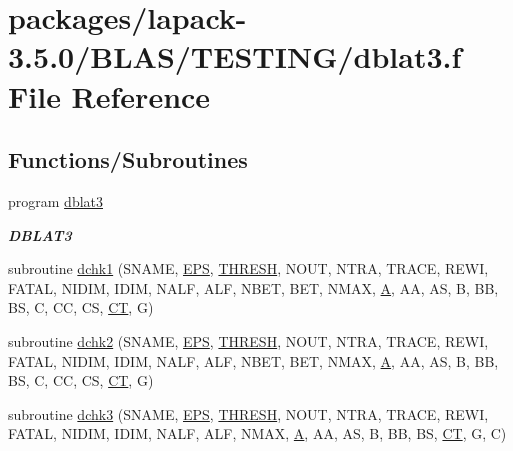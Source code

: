 \hypertarget{dblat3_8f}{}\section{packages/lapack-\/3.5.0/\+B\+L\+A\+S/\+T\+E\+S\+T\+I\+N\+G/dblat3.f File Reference}
\label{dblat3_8f}
\subsection*{Functions/\+Subroutines}
\begin{DoxyCompactItemize}
\item 
program \hyperlink{group__double__blas__testing_ga797f4debf4a6bff750260b5347fb61ed}{dblat3}
\begin{DoxyCompactList}\small\item\em {\bfseries D\+B\+L\+A\+T3} \end{DoxyCompactList}\item 
subroutine \hyperlink{dblat3_8f_aed7f81c98a71065151dd694b6abeceba}{dchk1} (S\+N\+A\+M\+E, \hyperlink{tukey_8c_a6ebf6899d6c1c8b7b9d09be872c05aae}{E\+P\+S}, \hyperlink{zlaqgs_8c_a0656018abfc9fa2821827415f5d5ea57}{T\+H\+R\+E\+S\+H}, N\+O\+U\+T, N\+T\+R\+A, T\+R\+A\+C\+E, R\+E\+W\+I, F\+A\+T\+A\+L, N\+I\+D\+I\+M, I\+D\+I\+M, N\+A\+L\+F, A\+L\+F, N\+B\+E\+T, B\+E\+T, N\+M\+A\+X, \hyperlink{classA}{A}, A\+A, A\+S, B, B\+B, B\+S, C, C\+C, C\+S, \hyperlink{tau_8h_ae9ab3801c1afb4f20cfd669d76aec283}{C\+T}, G)
\item 
subroutine \hyperlink{dblat3_8f_a1a71d1c607f3458ccd74e76c4275cb57}{dchk2} (S\+N\+A\+M\+E, \hyperlink{tukey_8c_a6ebf6899d6c1c8b7b9d09be872c05aae}{E\+P\+S}, \hyperlink{zlaqgs_8c_a0656018abfc9fa2821827415f5d5ea57}{T\+H\+R\+E\+S\+H}, N\+O\+U\+T, N\+T\+R\+A, T\+R\+A\+C\+E, R\+E\+W\+I, F\+A\+T\+A\+L, N\+I\+D\+I\+M, I\+D\+I\+M, N\+A\+L\+F, A\+L\+F, N\+B\+E\+T, B\+E\+T, N\+M\+A\+X, \hyperlink{classA}{A}, A\+A, A\+S, B, B\+B, B\+S, C, C\+C, C\+S, \hyperlink{tau_8h_ae9ab3801c1afb4f20cfd669d76aec283}{C\+T}, G)
\item 
subroutine \hyperlink{dblat3_8f_abd18265079a492381fbd81fee6d19046}{dchk3} (S\+N\+A\+M\+E, \hyperlink{tukey_8c_a6ebf6899d6c1c8b7b9d09be872c05aae}{E\+P\+S}, \hyperlink{zlaqgs_8c_a0656018abfc9fa2821827415f5d5ea57}{T\+H\+R\+E\+S\+H}, N\+O\+U\+T, N\+T\+R\+A, T\+R\+A\+C\+E, R\+E\+W\+I, F\+A\+T\+A\+L, N\+I\+D\+I\+M, I\+D\+I\+M, N\+A\+L\+F, A\+L\+F, N\+M\+A\+X, \hyperlink{classA}{A}, A\+A, A\+S, B, B\+B, B\+S, \hyperlink{tau_8h_ae9ab3801c1afb4f20cfd669d76aec283}{C\+T}, G, C)

\end{DoxyCompactItemize}
